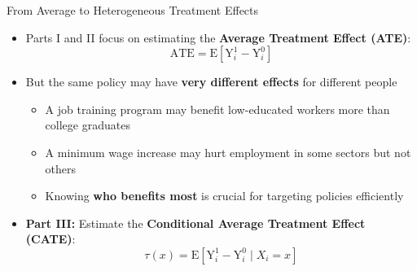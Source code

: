 \documentclass[hyperref={pdfpagelabels=false}]{beamer}
\begin{document}
\begin{frame}{From Average to Heterogeneous Treatment Effects}
	\begin{itemize}
		\item Parts I and II focus on estimating the \textbf{Average Treatment Effect (ATE)}:
		\begin{equation*}
			\text{ATE} = \mathrm{E}[\mathrm{Y}^{1}_{i} - \mathrm{Y}^{0}_{i}]
		\end{equation*}

		\vspace{0.2cm}
		\item But the same policy may have \textbf{very different effects} for different people
		\vspace{0.2cm}
		\begin{itemize}
			\item A job training program may benefit low-educated workers more than college graduates
			\vspace{0.2cm}
			\item A minimum wage increase may hurt employment in some sectors but not others
			\vspace{0.2cm}
			\item Knowing \textbf{who benefits most} is crucial for targeting policies efficiently
		\end{itemize}
		\vspace{0.3cm}
		\item \textbf{Part III:} Estimate the \textbf{Conditional Average Treatment Effect (CATE)}:
		\begin{equation*}
			\tau(x) = \mathrm{E}[\mathrm{Y}^{1}_{i} - \mathrm{Y}^{0}_{i} \mid X_{i} = x]
		\end{equation*}
	\end{itemize}
\end{frame}






\end{document}
